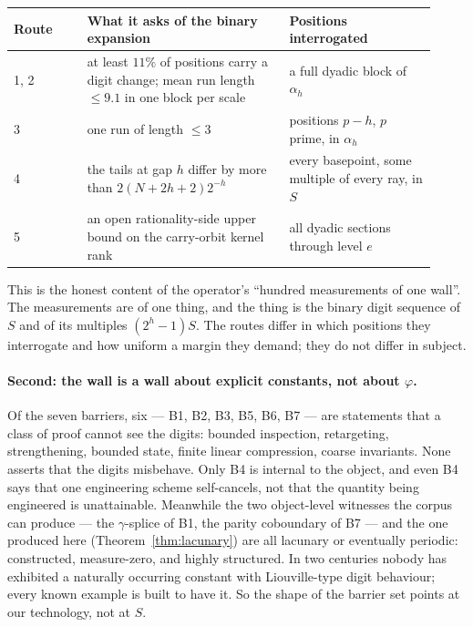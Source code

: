 \documentclass[11pt]{article}
\theoremstyle{plain}
\theoremstyle{definition}
\theoremstyle{remark}
\begin{document}
\begin{center}
\begin{tabular}{p{0.16\linewidth} p{0.44\linewidth} p{0.32\linewidth}}
\hline
Route & What it asks of the binary expansion & Positions interrogated \\
\hline
1, 2 & at least $11\%$ of positions carry a digit change; mean run length
$\le 9.1$ in one block per scale & a full dyadic block of $\alpha_h$ \\
3 & one run of length $\le 3$ & positions $p-h$, $p$ prime, in $\alpha_h$ \\
4 & the tails at gap $h$ differ by more than $2(N+2h+2)2^{-h}$ & every
basepoint, some multiple of every ray, in $S$ \\
5 & an open rationality-side upper bound on the carry-orbit kernel rank &
all dyadic sections through level $e$ \\
\hline
\end{tabular}
\end{center}

\noindent
This is the honest content of the operator's ``hundred measurements of one
wall''. The measurements are of one thing, and the thing is the binary digit
sequence of $S$ and of its multiples $(2^{h}-1)S$. The routes differ in which
positions they interrogate and how uniform a margin they demand; they do not
differ in subject.

\paragraph{Second: the wall is a wall about explicit constants, not about
$\varphi$.}
Of the seven barriers, six --- B1, B2, B3, B5, B6, B7 --- are statements that
a class of proof cannot see the digits: bounded inspection, retargeting,
strengthening, bounded state, finite linear compression, coarse invariants.
None asserts that the digits misbehave. Only B4 is internal to the object,
and even B4 says that one engineering scheme self-cancels, not that the
quantity being engineered is unattainable. Meanwhile the two object-level
witnesses the corpus can produce --- the $\gamma$-splice of B1, the parity
coboundary of B7 --- and the one produced here
(Theorem~\ref{thm:lacunary}) are all lacunary or eventually periodic:
constructed, measure-zero, and highly structured. In two centuries nobody has
exhibited a naturally occurring constant with Liouville-type digit behaviour;
every known example is built to have it. So the shape of the barrier set
points at our technology, not at $S$.
\end{document}
